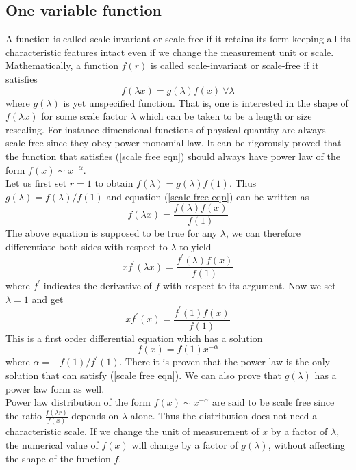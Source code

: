 	\subsection{One variable function}
	\label{subsect.one-variable-function}
	A function is called scale-invariant or scale-free if it retains its form keeping all its characteristic features intact even if we change the measurement unit or scale. Mathematically, a function $f(r)$ is called scale-invariant or scale-free if it satisfies
	\begin{equation}
		f(\lambda x) = g(\lambda) f(x) \ \forall \lambda
		\label{scale free eqn}
	\end{equation}
	where $g(\lambda)$ is yet unspecified function. That is, one is interested in the shape of $f(\lambda x)$ for some scale factor $\lambda$ which can be taken to be a length or size rescaling. For instance dimensional functions of physical quantity are always scale-free since they obey power monomial law. It can be rigorously proved that the function that satisfies (\ref{scale free eqn}) should always have power law of the form $f(x) \sim x^{-\alpha}$.\\
	Let us first set $r=1$ to obtain $f(\lambda) = g(\lambda)f(1)$. Thus $g(\lambda)=f(\lambda)/f(1)$ and equation (\ref{scale free eqn}) can be written as
	\begin{equation}
		f(\lambda x) = \frac{f(\lambda) f(x)}{f(1)}
	\end{equation}
	The above equation is supposed to be true for any $\lambda$, we can therefore differentiate both sides with respect to $\lambda$ to yield
	\begin{equation}
		x f^\prime(\lambda x) = \frac{f^\prime(\lambda) f(x)}{f(1)}
	\end{equation}
	where $f^\prime$ indicates the derivative of $f$ with respect to its argument. Now we set $\lambda=1$ and get
	\begin{equation}
		x f^\prime(x) = \frac{f^\prime(1) f(x)}{f(1)}
	\end{equation}
	This is a first order differential equation which has a solution
	\begin{equation}
		f(x) = f(1) x^{-\alpha}
	\end{equation}
	where $\alpha = - f(1) / f^\prime (1)$. There it is proven that the power law is the only solution that can satisfy (\ref{scale free eqn}). We can also prove that $g(\lambda)$ has a power law form as well.\\
	Power law distribution of the form $f(x) \sim x^{-\alpha}$ are said to be scale free since the ratio $\frac{f(\lambda r)}{f(x)}$ depends on $\lambda$ alone. Thus the distribution does not need a characteristic scale. If we change the unit of measurement of $x$ by a factor of $\lambda$, the numerical value of $f(x)$ will change by a factor of $g(\lambda)$, without affecting the shape of the function $f$. 
	
